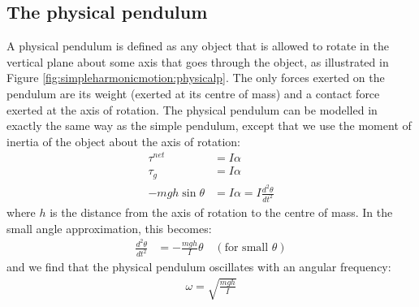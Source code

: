 \subsection{The physical pendulum}
A physical pendulum is defined as any object that is allowed to rotate in the vertical plane about some axis that goes through the object, as illustrated in Figure \ref{fig:simpleharmonicmotion:physicalp}.
The only forces exerted on the pendulum are its weight (exerted at its centre of mass) and a contact force exerted at the axis of rotation. The physical pendulum can be modelled in exactly the same way as the simple pendulum, except that we use the moment of inertia of the object about the axis of rotation:
\begin{align*}
\tau^{net} &= I\alpha\\
\tau_g &= I \alpha\\
-mgh\sin\theta &= I\alpha = I \frac{d^2\theta}{dt^2}
\end{align*}
where $h$ is the distance from the axis of rotation to the centre of mass. In the small angle approximation, this becomes:
\begin{align*}
\frac{d^2\theta}{dt^2} &=-\frac{mgh}{I}\theta \quad (\text{for small }\theta)
\end{align*}
and we find that the physical pendulum oscillates with an angular frequency:
\begin{align*}
\omega = \sqrt{\frac{mgh}{I}}
\end{align*}


\newpage
